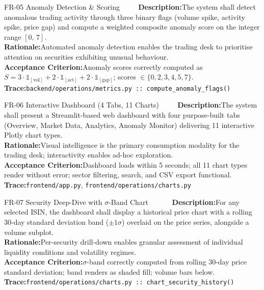 \documentclass[
  11pt,
  a4paper,
  twoside,
  openany
]{report}
\begin{document}
\vspace{6pt}

\begin{requirement}{FR-05 \;\textbar\; Anomaly Detection \& Scoring\hfill\textcolor{white}{Must}}
\textbf{Description:}\;The system shall detect anomalous trading activity through three binary flags (volume spike, activity spike, price gap) and compute a weighted composite anomaly score on the integer range $[0,\,7]$.\\[4pt]
\textbf{Rationale:}\;Automated anomaly detection enables the trading desk to prioritise attention on securities exhibiting unusual behaviour.\\[4pt]
\textbf{Acceptance Criterion:}\;Anomaly scores correctly computed as $S = 3 \cdot \mathbb{1}_{[\mathrm{vol}]} + 2 \cdot \mathbb{1}_{[\mathrm{act}]} + 2 \cdot \mathbb{1}_{[\mathrm{gap}]}$; scores $\in \{0, 2, 3, 4, 5, 7\}$.\\[4pt]
\textbf{Trace:}\;\texttt{backend/operations/metrics.py :: compute\_anomaly\_flags()}
\end{requirement}

\vspace{6pt}

\begin{requirement}{FR-06 \;\textbar\; Interactive Dashboard (4 Tabs, 11 Charts)\hfill\textcolor{white}{Must}}
\textbf{Description:}\;The system shall present a Streamlit-based web dashboard with four purpose-built tabs (Overview, Market Data, Analytics, Anomaly Monitor) delivering 11 interactive Plotly chart types.\\[4pt]
\textbf{Rationale:}\;Visual intelligence is the primary consumption modality for the trading desk; interactivity enables ad-hoc exploration.\\[4pt]
\textbf{Acceptance Criterion:}\;Dashboard loads within 5 seconds; all 11 chart types render without error; sector filtering, search, and CSV export functional.\\[4pt]
\textbf{Trace:}\;\texttt{frontend/app.py}, \texttt{frontend/operations/charts.py}
\end{requirement}

\vspace{6pt}

\begin{requirement}{FR-07 \;\textbar\; Security Deep-Dive with $\sigma$-Band Chart\hfill\textcolor{white}{Should}}
\textbf{Description:}\;For any selected ISIN, the dashboard shall display a historical price chart with a rolling 30-day standard deviation band ($\pm 1\sigma$) overlaid on the price series, alongside a volume subplot.\\[4pt]
\textbf{Rationale:}\;Per-security drill-down enables granular assessment of individual liquidity conditions and volatility regimes.\\[4pt]
\textbf{Acceptance Criterion:}\;$\sigma$-band correctly computed from rolling 30-day price standard deviation; band renders as shaded fill; volume bars below.\\[4pt]
\textbf{Trace:}\;\texttt{frontend/operations/charts.py :: chart\_security\_history()}
\end{requirement}
\end{document}
